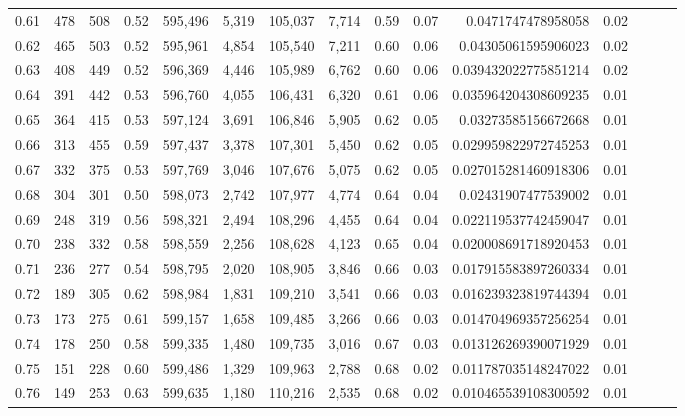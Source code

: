 \begin{tabular}{rrrrrrrrrrrrrrr}
0.61 &     478 &    508 &  0.52 &  595,496 &    5,319 &  105,037 &    7,714 &  0.59 &  0.07 &      0.0471747478958058 &      0.02 \\
0.62 &     465 &    503 &  0.52 &  595,961 &    4,854 &  105,540 &    7,211 &  0.60 &  0.06 &     0.04305061595906023 &      0.02 \\
0.63 &     408 &    449 &  0.52 &  596,369 &    4,446 &  105,989 &    6,762 &  0.60 &  0.06 &    0.039432022775851214 &      0.02 \\
0.64 &     391 &    442 &  0.53 &  596,760 &    4,055 &  106,431 &    6,320 &  0.61 &  0.06 &    0.035964204308609235 &      0.01 \\
0.65 &     364 &    415 &  0.53 &  597,124 &    3,691 &  106,846 &    5,905 &  0.62 &  0.05 &     0.03273585156672668 &      0.01 \\
0.66 &     313 &    455 &  0.59 &  597,437 &    3,378 &  107,301 &    5,450 &  0.62 &  0.05 &    0.029959822972745253 &      0.01 \\
0.67 &     332 &    375 &  0.53 &  597,769 &    3,046 &  107,676 &    5,075 &  0.62 &  0.05 &    0.027015281460918306 &      0.01 \\
0.68 &     304 &    301 &  0.50 &  598,073 &    2,742 &  107,977 &    4,774 &  0.64 &  0.04 &     0.02431907477539002 &      0.01 \\
0.69 &     248 &    319 &  0.56 &  598,321 &    2,494 &  108,296 &    4,455 &  0.64 &  0.04 &    0.022119537742459047 &      0.01 \\
0.70 &     238 &    332 &  0.58 &  598,559 &    2,256 &  108,628 &    4,123 &  0.65 &  0.04 &    0.020008691718920453 &      0.01 \\
0.71 &     236 &    277 &  0.54 &  598,795 &    2,020 &  108,905 &    3,846 &  0.66 &  0.03 &    0.017915583897260334 &      0.01 \\
0.72 &     189 &    305 &  0.62 &  598,984 &    1,831 &  109,210 &    3,541 &  0.66 &  0.03 &    0.016239323819744394 &      0.01 \\
0.73 &     173 &    275 &  0.61 &  599,157 &    1,658 &  109,485 &    3,266 &  0.66 &  0.03 &    0.014704969357256254 &      0.01 \\
0.74 &     178 &    250 &  0.58 &  599,335 &    1,480 &  109,735 &    3,016 &  0.67 &  0.03 &    0.013126269390071929 &      0.01 \\
0.75 &     151 &    228 &  0.60 &  599,486 &    1,329 &  109,963 &    2,788 &  0.68 &  0.02 &    0.011787035148247022 &      0.01 \\
0.76 &     149 &    253 &  0.63 &  599,635 &    1,180 &  110,216 &    2,535 &  0.68 &  0.02 &    0.010465539108300592 &      0.01 \\

\end{tabular}
